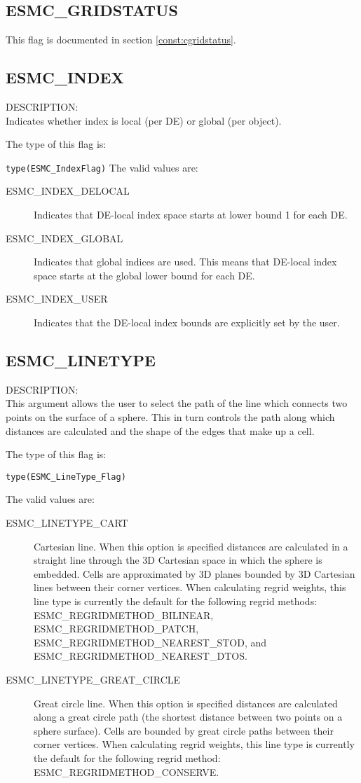 \subsection{ESMC\_GRIDSTATUS}
This flag is documented in section \ref{const:cgridstatus}.

\subsection{ESMC\_INDEX}
{\sf DESCRIPTION:\\}
Indicates whether index is local (per DE) or global (per object).

The type of this flag is:

{\tt type(ESMC\_IndexFlag)}
\label{const:indexflag}
The valid values are:
\begin{description}
\item [ESMC\_INDEX\_DELOCAL]
      Indicates that DE-local index space starts at lower bound 1 for each DE.
\item [ESMC\_INDEX\_GLOBAL]
      Indicates that global indices are used. This means that DE-local index
      space starts at the global lower bound for each DE.
\item [ESMC\_INDEX\_USER]
      Indicates that the DE-local index bounds are explicitly set by the user.
\end{description}

\subsection{ESMC\_LINETYPE}
\label{opt:lineType}

{\sf DESCRIPTION:\\}  This argument allows the user to select the path of the line which connects two points on the surface of a sphere.
This in turn controls the path along which distances are calculated and the shape of the edges that make up a cell.

The type of this flag is:

{\tt type(ESMC\_LineType\_Flag)}

The valid values are:
\begin{description}
\item [ESMC\_LINETYPE\_CART]
   Cartesian line. When this option is specified distances are calculated in a straight line through the 3D Cartesian space
   in which the sphere is embedded. Cells are approximated by 3D planes bounded by 3D Cartesian lines between their corner vertices.
   When calculating regrid weights, this line type is currently the default for the following regrid methods: ESMC\_REGRIDMETHOD\_BILINEAR,
   ESMC\_REGRIDMETHOD\_PATCH, ESMC\_REGRIDMETHOD\_NEAREST\_STOD, and  ESMC\_REGRIDMETHOD\_NEAREST\_DTOS.
\item [ESMC\_LINETYPE\_GREAT\_CIRCLE]
   Great circle line. When this option is specified distances are calculated along a great circle path (the shortest distance
   between two points on a sphere surface). Cells are bounded by great circle paths between their corner vertices. When calculating regrid
   weights, this line type is currently the default for the following regrid method: ESMC\_REGRIDMETHOD\_CONSERVE.
\end{description}


